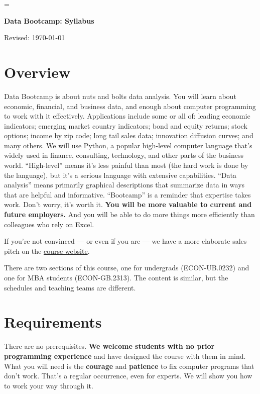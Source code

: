 \documentclass[11pt]{article}
\begin{document}
\parskip=\bigskipamount
\parindent=0.0in
\thispagestyle{empty}


\bigskip\bigskip
\centerline{\Large \bf Data Bootcamp:  Syllabus}
\centerline{Revised: \today}


\section*{Overview}

Data Bootcamp is about nuts and bolts data analysis. You will learn about economic, financial, and business
data, and enough about computer programming to work with it effectively.
Applications include some or all of: leading economic indicators; emerging market country indicators;
bond and equity returns; stock options; income by zip code; long tail sales data; innovation diffusion curves; and many others.
We will use Python, a popular high-level computer language that's widely used in finance, consulting,
technology, and other parts of the business world.
``High-level'' means it's less painful than most (the hard work is done by the language),
but it's a serious language with extensive capabilities.
``Data analysis'' means primarily graphical descriptions that summarize data
in ways that are helpful and informative.
``Bootcamp'' is a reminder that expertise takes work. Don't worry, it's worth it.
{\bf You will be more valuable to current and future employers.\/}
And you will be able to do more things more efficiently than
colleagues who rely on Excel.

If you're not convinced --- or even if you are ---
we have a more elaborate sales pitch on the
\href{http://databootcamp.nyuecon.com/}{course website}.

There are two sections of this course,
one for undergrads (ECON-UB.0232) and one for MBA students (ECON-GB.2313).
The content is similar, but the schedules and teaching teams are different.


\section*{Requirements}

There are no prerequisites.
{\bf We welcome students with no prior programming experience\/}
and have designed the course with them in mind.
What you will need is the {\bf courage\/} and {\bf patience\/} to fix computer programs that don't work.
That's a regular occurrence, even for experts.
We will show you how to work your way through it.
\end{document}
